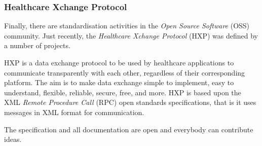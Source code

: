 %
%
%
%
%
%
%

\subsubsection{Healthcare Xchange Protocol}
\label{healthcare_xchange_protocol_heading}

Finally, there are standardisation activities in the \emph{Open Source Software}
(OSS) community. Just recently, the \emph{Healthcare Xchange Protocol} (HXP)
\cite{hxp} was defined by a number of projects.

HXP is a data exchange protocol to be used by healthcare applications to
communicate transparently with each other, regardless of their corresponding
platform. The aim is to make data exchange simple to implement, easy to
understand, flexible, reliable, secure, free, and more. HXP is based upon the
XML \emph{Remote Procedure Call} (RPC) open standards specifications, that is
it uses messages in XML format for communication.

The specification and all documentation are open and everybody can contribute
ideas.
